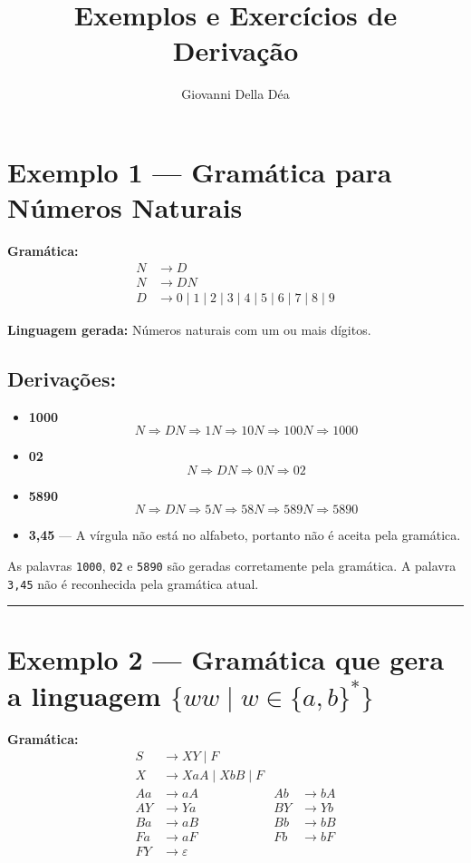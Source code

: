 \documentclass[12pt]{article}
\title{Exemplos e Exercícios de Derivação}
\author{Giovanni Della Déa}
\begin{document}
\maketitle

\section*{Exemplo 1 — Gramática para Números Naturais}

\textbf{Gramática:}
\begin{align*}
N &\rightarrow D \\
N &\rightarrow DN \\
D &\rightarrow 0 \mid 1 \mid 2 \mid 3 \mid 4 \mid 5 \mid 6 \mid 7 \mid 8 \mid 9
\end{align*}

\textbf{Linguagem gerada:} Números naturais com um ou mais dígitos.

\subsection*{Derivações:}
\begin{itemize}
  \item \textbf{1000}
    \[
    N \Rightarrow DN \Rightarrow 1N \Rightarrow 10N \Rightarrow 100N \Rightarrow 1000
    \]
  \item \textbf{02}
    \[
    N \Rightarrow DN \Rightarrow 0N \Rightarrow 02
    \]
  \item \textbf{5890}
    \[
    N \Rightarrow DN \Rightarrow 5N \Rightarrow 58N \Rightarrow 589N \Rightarrow 5890
    \]
  \item \textbf{3,45} — A vírgula não está no alfabeto, portanto não é aceita pela gramática.
\end{itemize}

\vspace{1em}
As palavras \texttt{1000}, \texttt{02} e \texttt{5890} são geradas corretamente pela gramática.  
A palavra \texttt{3,45} não é reconhecida pela gramática atual.

\hrule

\section*{Exemplo 2 — Gramática que gera a linguagem $\{ww \mid w \in \{a,b\}^*\}$}

\textbf{Gramática:}
\begin{align*}
S &\rightarrow XY \mid F \\
X &\rightarrow XaA \mid XbB \mid F \\
Aa &\rightarrow aA \quad & Ab &\rightarrow bA \\
AY &\rightarrow Ya \quad & BY &\rightarrow Yb \\
Ba &\rightarrow aB \quad & Bb &\rightarrow bB \\
Fa &\rightarrow aF \quad & Fb &\rightarrow bF \\
FY &\rightarrow \varepsilon
\end{align*}
\end{document}
